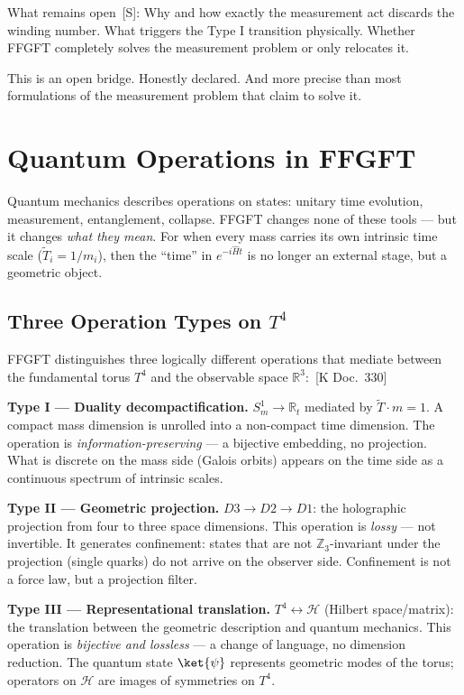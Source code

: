 \documentclass[11pt,oneside]{book}
\newcommand{\status}[1]{\penalty10000\,{\scriptsize\textcolor{gray!60}{[#1]}}}
\begin{document}
What remains open \status{S}: Why and how exactly the measurement act discards
the winding number. What triggers the Type I transition physically. Whether
FFGFT completely solves the measurement problem or only relocates it.

This is an open bridge. Honestly declared. And more precise than most
formulations of the measurement problem that claim to solve it.


\chapter{Quantum Operations in FFGFT}

Quantum mechanics describes operations on states: unitary time evolution,
measurement, entanglement, collapse. FFGFT changes none of these tools —
but it changes \textit{what they mean}. For when every mass carries its own
intrinsic time scale ($\tilde{T}_i = 1/m_i$), then the \enquote{time} in $e^{-i\hat{H}t}$
is no longer an external stage, but a geometric object.

\section*{Three Operation Types on $T^4$}

FFGFT distinguishes three logically different operations that mediate between
the fundamental torus $T^4$ and the observable space $\mathbb{R}^3$: \status{K Doc.~330}

\textbf{Type I — Duality decompactification.}
$S^1_m \to \mathbb{R}_t$ mediated by $\tilde{T}\cdot m = 1$.
A compact mass dimension is unrolled into a non-compact time dimension. The
operation is \textit{information-preserving} — a bijective embedding, no
projection. What is discrete on the mass side (Galois orbits) appears on the
time side as a continuous spectrum of intrinsic scales.

\textbf{Type II — Geometric projection.}
$D3 \to D2 \to D1$: the holographic projection from four to three space
dimensions. This operation is \textit{lossy} — not invertible. It generates
confinement: states that are not $\mathbb{Z}_3$-invariant under the projection
(single quarks) do not arrive on the observer side. Confinement is not a
force law, but a projection filter.

\textbf{Type III — Representational translation.}
$T^4 \leftrightarrow \mathcal{H}$ (Hilbert space/matrix): the translation
between the geometric description and quantum mechanics. This operation is
\textit{bijective and lossless} — a change of language, no dimension reduction.
The quantum state $\ket{\psi}$ represents geometric modes of the torus;
operators on $\mathcal{H}$ are images of symmetries on $T^4$.
\end{document}
